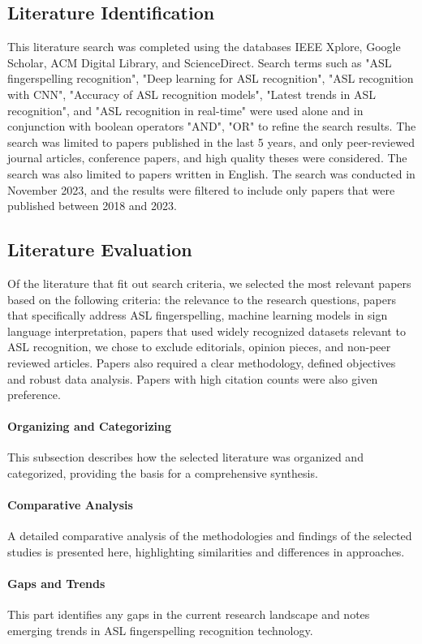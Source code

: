 \subsection{Literature Identification}
This literature search was completed using the databases IEEE Xplore, Google Scholar, ACM Digital Library, and ScienceDirect. Search terms such as "ASL fingerspelling recognition", "Deep learning for ASL recognition",  "ASL recognition with CNN", "Accuracy of ASL recognition models", "Latest trends in ASL recognition", and "ASL recognition in real-time" were used alone and in conjunction with boolean operators "AND", "OR" to refine the search results. The search was limited to papers published in the last 5 years, and only peer-reviewed journal articles, conference papers, and high quality theses were considered. The search was also limited to papers written in English. The search was conducted in November 2023, and the results were filtered to include only papers that were published between 2018 and 2023.
\subsection{Literature Evaluation}
Of the literature that fit out search criteria, we selected the most relevant papers based on the following criteria: the relevance to the research questions, papers that specifically address ASL fingerspelling, machine learning models in sign language interpretation, papers that used widely recognized datasets relevant to ASL recognition, we chose to exclude editorials, opinion pieces, and non-peer reviewed articles. Papers also required a clear methodology, defined objectives and robust data analysis. Papers with high citation counts were also given preference.
\paragraph{Organizing and Categorizing}
This subsection describes how the selected literature was organized and categorized, providing the basis for a comprehensive synthesis.

\paragraph{Comparative Analysis}
A detailed comparative analysis of the methodologies and findings of the selected studies is presented here, highlighting similarities and differences in approaches.

\paragraph{Gaps and Trends}
This part identifies any gaps in the current research landscape and notes emerging trends in ASL fingerspelling recognition technology.

